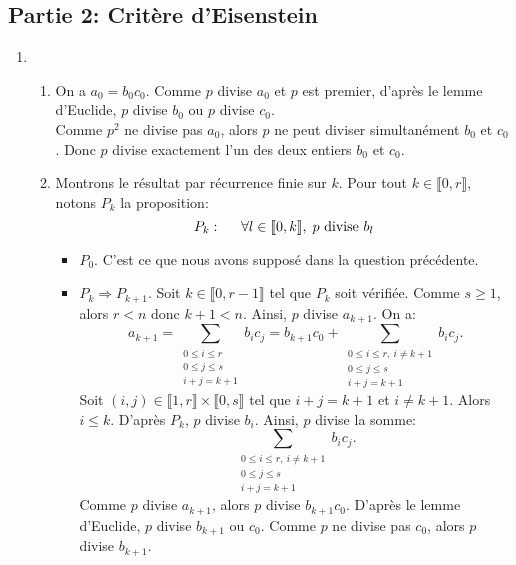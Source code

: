  \subsection*{Partie 2: Critère d'Eisenstein}
 \begin{enumerate}
 \item 
 \begin{enumerate}
    \item On a $a_{0} = b_{0}c_{0}$. Comme $p$ divise $a_{0}$ et $p$ est premier, d'après le lemme d'Euclide, $p$ divise $b_{0}$ ou $p$ divise $c_{0}$.\\
       Comme $p^{2}$ ne divise pas $a_{0}$, alors $p$ ne peut diviser simultanément $b_{0}$ et $c_{0}$. Donc $p$ divise exactement l'un des deux entiers $b_{0}$ et $c_{0}$. 
    \item Montrons le résultat par récurrence finie sur $k$. Pour tout $k\in \llbracket 0,r\rrbracket$, notons $P_{k}$ la proposition:
    \begin{displaymath}
      P_{k}:\hspace{0.5cm} \forall l\in \llbracket 0, k\rrbracket,\; p\text{ divise } b_{l}
    \end{displaymath}
        \begin{itemize}
          \item[\textbullet] $P_{0}$. C'est ce que nous avons supposé dans la question précédente.
          \item[\textbullet] $P_{k}\Rightarrow P_{k+1}$. Soit $k\in \llbracket 0, r-1\rrbracket$ tel que $P_{k}$ soit vérifiée. Comme $s\geq 1$, alors $r < n$ donc $k+1 < n$. Ainsi, $p$ divise $a_{k+1}$. On a:
          \begin{displaymath}
            a_{k+1} = \sum_{\substack{0\leq i \leq r \\ 0\leq j \leq s \\ i+j = k+1}}b_{i}c_{j} =
             b_{k+1}c_{0} + \sum_{\substack{0\leq i \leq r,\ i\neq k+1 \\ 0\leq j\leq s \\ i+j = k+1}}b_{i}c_{j}.
          \end{displaymath}
          Soit $(i,j)\in \llbracket 1,r\rrbracket \times \llbracket 0, s\rrbracket$ tel que $i+j = k+1$ et $i\neq k+1$. Alors $i \leq k$. D'après $P_{k}$, $p$ divise $b_{i}$. Ainsi, $p$ divise la somme:
             $$\sum_{\substack{0\leq i \leq r,\ i\neq k+1 \\ 0\leq j\leq s \\ i+j = k+1}}b_{i}c_{j}.$$
          Comme $p$ divise $a_{k+1}$, alors $p$ divise $b_{k+1}c_{0}$. D'après le lemme d'Euclide, $p$ divise $b_{k+1}$ ou $c_{0}$. Comme $p$ ne divise pas $c_{0}$, alors $p$ divise $b_{k+1}$.\\

\end{itemize}
\end{enumerate}
\end{enumerate}
